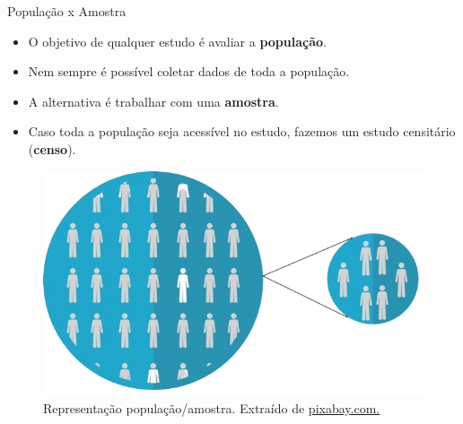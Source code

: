 \documentclass[
  ignorenonframetext,
  serif,
  professionalfont,
  usenames,
  dvipsnames,
  aspectratio = 169]{beamer}
\def\beginAHalfColumn{\begin{minipage}{0.49\textwidth}}%
\def\endColumns{\end{minipage}}%
\begin{document}
\begin{frame}{População x Amostra}
\protect\hypertarget{populauxe7uxe3o-x-amostra}{}
\beginAHalfColumn

\begin{itemize}
\item
  O objetivo de qualquer estudo é avaliar a \textbf{população}.
\item
  Nem sempre é possível coletar dados de toda a população.
\item
  A alternativa é trabalhar com uma \textbf{amostra}.
\item
  Caso toda a população seja acessível no estudo, fazemos um estudo
  censitário (\textbf{censo}).
\end{itemize}

\endColumns
\beginAHalfColumn

\begin{figure}

{\centering \includegraphics[width=1\linewidth]{./img/populacao-amostra3} 

}

\caption{Representação população/amostra. Extraído de \href{https://cdn.pixabay.com/photo/2017/10/25/18/18/rare-disease-2888820_1280.png}{pixabay.com.}}\label{fig:unnamed-chunk-2}
\end{figure}

\endColumns
\end{frame}
\end{document}
